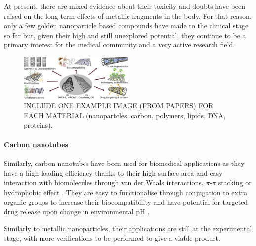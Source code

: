 At present, there are mixed evidence about their toxicity \cite{Boisselier2009} and doubts have been raised on the long term effects of metallic fragments in the body. For that reason, only a few golden nanoparticle based compounds have made to the clinical stage so far \cite{Singh2018} but, given their high and still unexplored potential, they continue to be a primary interest for the medical community and a very active research field.

\begin{figure}
\begin{center}
\includegraphics[width = 0.5\textwidth]{1introduction/pics/carbon_review.jpg}
\vspace{0.2cm}
\caption[Materials for drug delivery vehicles]{INCLUDE ONE EXAMPLE IMAGE (FROM PAPERS) FOR EACH MATERIAL (nanopartcles, carbon, polymers, lipids, DNA, proteins).} \label{fig:vehicles}
\end{center}
\end{figure}

\paragraph{Carbon nanotubes}
Similarly, carbon nanotubes have been used for biomedical applications as they have a high loading efficiency thanks to their high surface area and easy interaction with biomolecules through van der Waals interactions, $\pi$-$\pi$ stacking or hydrophobic effect \cite{Erol2017}. They are easy to functionalise through conjugation to extra organic groups to increase their biocompatibility and have potential for targeted drug release upon change in environmental pH \cite{Depan2011}.

Similarly to metallic nanoparticles, their applications are still at the experimental stage, with more verifications to be performed to give a viable product.


